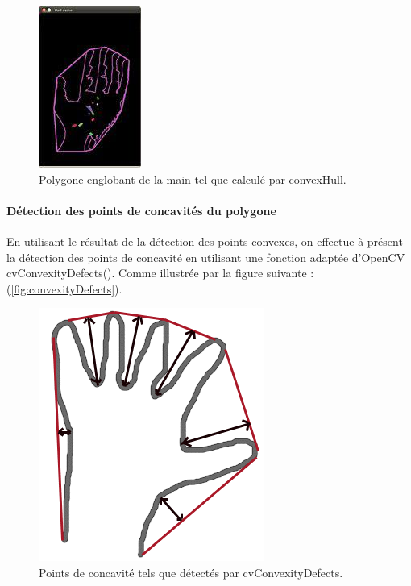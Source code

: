 \begin{figure}[htb!]
\centerline{\includegraphics{convexePolygone.jpg}}
\caption{Polygone englobant de la main tel que calculé par convexHull.}
\label{fig:convexePolygone}
\end{figure}

\paragraph{Détection des points de concavités du polygone}
En utilisant le résultat de la détection des points convexes, on effectue à présent la détection des points de concavité en utilisant une fonction adaptée d’OpenCV cvConvexityDefects(). Comme illustrée par la figure suivante : (\autoref{fig:convexityDefects}).

\begin{figure}[htb!]
\centerline{\includegraphics[scale=0.6]{convexityDefects.png}}
\caption{Points de concavité tels que détectés par cvConvexityDefects.}
\label{fig:convexityDefects}
\end{figure}

